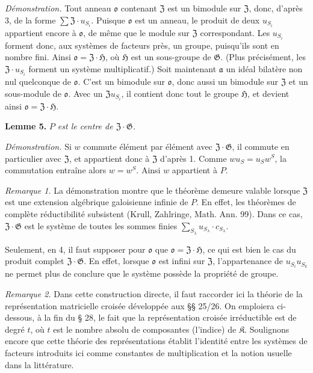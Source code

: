 \noindent\emph{Démonstration.} Tout anneau \(\mathfrak o\) contenant \(\mathfrak Z\) est un bimodule sur \(\mathfrak Z\), donc, d'après 3, de la forme \(\sum\mathfrak Z\cdot u_{S_i}\). Puisque \(\mathfrak o\) est un anneau, le produit de deux \(u_{S_i}\) appartient encore à \(\mathfrak o\), de même que le module sur \(\mathfrak Z\) correspondant. Les \(u_{S_i}\) forment donc, aux systèmes de facteurs près, un groupe, puisqu'ils sont en nombre fini. Ainsi \(\mathfrak o=\mathfrak Z\cdot\mathfrak H\), où \(\mathfrak H\) est un sous-groupe de \(\mathfrak G\). (Plus précisément, les \(\mathfrak Z\cdot u_{S_i}\) forment un système multiplicatif.) Soit maintenant \(\mathfrak a\) un idéal bilatère non nul quelconque de \(\mathfrak o\). C'est un bimodule sur \(\mathfrak o\), donc aussi un bimodule sur \(\mathfrak Z\) et un sous-module de \(\mathfrak o\). Avec un \(\mathfrak Zu_{S_i}\), il contient donc tout le groupe \(\mathfrak H\), et devient ainsi \(\mathfrak o=\mathfrak Z\cdot\mathfrak H\).

\noindent\textbf{Lemme 5.} \emph{\(P\) est le centre de \(\mathfrak Z\cdot\mathfrak G\).}

\noindent\emph{Démonstration.} Si \(w\) commute élément par élément avec \(\mathfrak Z\cdot\mathfrak G\), il commute en particulier avec \(\mathfrak Z\), et appartient donc à \(\mathfrak Z\) d'après 1. Comme \(wu_S=u_Sw^S\), la commutation entraîne alors \(w=w^S\). Ainsi \(w\) appartient à \(P\).

\noindent\emph{Remarque 1.} La démonstration montre que le théorème demeure valable lorsque \(\mathfrak Z\) est une extension algébrique galoisienne infinie de \(P\). En effet, les théorèmes de complète réductibilité subsistent (Krull, Zahlringe, Math. Ann. 99). Dans ce cas, \(\mathfrak Z\cdot\mathfrak G\) est le système de toutes les sommes finies \(\sum_{S_\lambda}u_{S_\lambda}\cdot c_{S_\lambda}\).

Seulement, en 4, il faut supposer pour \(\mathfrak o\) que \(\mathfrak o=\mathfrak Z\cdot\mathfrak H\), ce qui est bien le cas du produit complet \(\mathfrak Z\cdot\mathfrak G\). En effet, lorsque \(\mathfrak o\) est infini sur \(\mathfrak Z\), l'appartenance de \(u_{S_i}u_{S_k}\) ne permet plus de conclure que le système possède la propriété de groupe.

\noindent\emph{Remarque 2.} Dans cette construction directe, il faut raccorder ici la théorie de la représentation matricielle croisée développée aux \S\S{} 25/26. On emploiera ci-dessous, à la fin du \S{} 28, le fait que la représentation croisée irréductible est de degré \(t\), où \(t\) est le nombre absolu de composantes (l'indice) de \(\mathfrak K\). Soulignons encore que cette théorie des représentations établit l'identité entre les systèmes de facteurs introduits ici comme constantes de multiplication et la notion usuelle dans la littérature.

